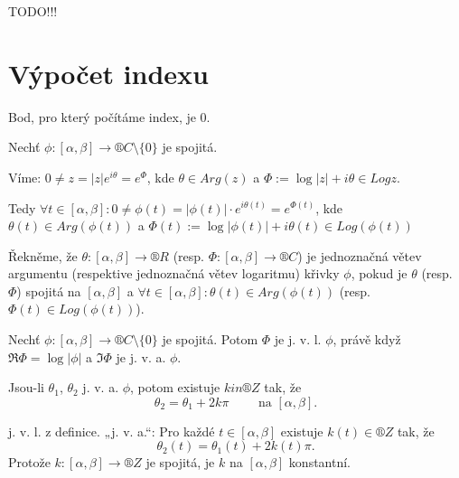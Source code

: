 \documentclass[12pt]{article}					%
\begin{document}
TODO!!!


\section{Výpočet indexu}
\begin{poznamka}[Úmluva]
	Bod, pro který počítáme index, je 0.
\end{poznamka}

\begin{definice}
	Nechť $\phi: [\alpha, \beta] \rightarrow ®C \setminus \{0\}$ je spojitá.

	\begin{poznamkain}
		Víme: $0 ≠ z = |z|e^{i\theta} = e^\Phi$, kde $\theta \in Arg(z)$ a $\Phi := \log |z| + i\theta \in Log z$.

		Tedy $\forall t \in [\alpha, \beta]: 0 ≠ \phi(t) = |\phi(t)|·e^{i\theta(t)} = e^{\Phi(t)}$, kde $\theta(t) \in Arg(\phi(t))$ a $\Phi(t) := \log|\phi(t)| + i \theta(t) \in Log(\phi(t))$
	\end{poznamkain}

	Řekněme, že $\theta: [\alpha, \beta] \rightarrow ®R$ (resp. $\Phi: [\alpha, \beta] \rightarrow ®C$) je jednoznačná větev argumentu (respektive jednoznačná větev logaritmu) křivky $\phi$, pokud je $\theta$ (resp. $\Phi$) spojitá na $[\alpha, \beta]$ a $\forall t \in [\alpha, \beta]: \theta(t) \in Arg(\phi(t))$ (resp. $\Phi(t) \in Log(\phi(t))$).
\end{definice}

\begin{veta}[O jednoznačnosti j. v. a. a j. v. l.]
	Nechť $\phi: [\alpha, \beta] \rightarrow ®C \setminus \{0\}$ je spojitá. Potom $\Phi$ je j. v. l. $\phi$, právě když $\Re \Phi = \log|\phi|$ a $\Im \Phi$ je j. v. a. $\phi$.

	Jsou-li $\theta_1$, $\theta_2$ j. v. a. $\phi$, potom existuje $k in ®Z$ tak, že
	$$ \theta_2 = \theta_1 + 2k\pi \qquad \text{ na } [\alpha, \beta]. $$

	\begin{dukazin}
		j. v. l. z definice. „j. v. a.“: Pro každé $t \in [\alpha, \beta]$ existuje $k(t) \in ®Z$ tak, že
		$$ \theta_2(t) = \theta_1(t) + 2k(t) \pi. $$
		Protože $k: [\alpha, \beta] \rightarrow ®Z$ je spojitá, je $k$ na $[\alpha, \beta]$ konstantní.
	\end{dukazin}
\end{veta}
\end{document}
